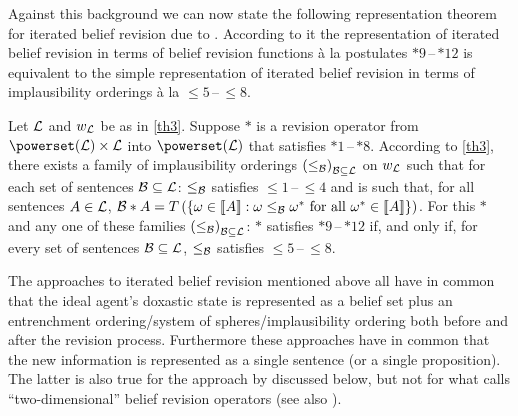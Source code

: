 Against this background we can now state the following representation theorem for iterated belief revision due to \citet{dp97}. According to it the representation of iterated belief revision in terms of belief revision functions \`{a} la postulates $*9$\,--\,$*12$ is equivalent to the simple representation of iterated belief revision in terms of implausibility orderings \`{a} la $\leq\!\!5$\,--\,$\leq\!\!8$.
\begin{theorem}\label{th4}
Let $\cal L$ and $w_{\cal L}$ be as in \autoref{th3}. Suppose $*$ is a revision operator from $\powerset\!\left(\cal L\right)\times\cal L$ into $\powerset\!\left(\cal L\right)$ that satisfies $*1$\,--\,$*8$. According to \autoref{th3}, there exists a family of implausibility orderings $\left(\leq_{\cal B}\right)_{\cal B\subseteq L}$ on $w_{\cal L}$ such that for each set of sentences $\cal B\subseteq L$: $\leq_{\cal B}$ satisfies $\leq\!\!1$\,--\,$\leq\!\!4$ and is such that, for all sentences $A\in\cal L$, $\begin{cal}B\end{cal}*A=T\left(\left\{\omega\in\llbracket A\rrbracket:\omega\leq_{\cal B}\omega^*\mbox{ for all }\omega^*\in\llbracket A\rrbracket\right\}\right)$. For this $*$ and any one of these families $\left(\leq_{\cal B}\right)_{\cal B\subseteq L}$: $*$ satisfies $*9$\,--\,$*12$ if, and only if, for every set of sentences $\cal B\subseteq L$, $\leq_{\cal B}$ satisfies $\leq\!\!5$\,--\,$\leq\!\!8$.
\end{theorem}
The approaches to iterated belief revision mentioned above all have in common that the ideal agent's doxastic state is represented as a belief set plus an entrenchment ordering/system of spheres/implausibility ordering both before and after the revision process. Furthermore these approaches have in common that the new information is represented as a single sentence (or a single proposition). The latter is also true for the approach by \citet{jt07} discussed below, but not for what \citet{r09} calls ``two-dimensional'' belief revision operators (see also \citealt{c97,fr04,r07}).

